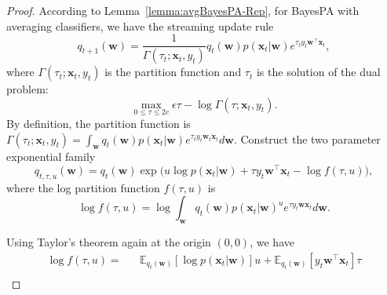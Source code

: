 \documentclass[twoside,11pt]{article}
\newcommand{\xv}{\bm{x}}
\newcommand{\wv}{\bm{w}}
\newcommand{\eat}[1]{}
\newcommand{\ep}{\mathbb{E}}
\newcommand{\E}{\mathbb{E}}
\newcommand{\strin}[1]{\todo[size=\small, color=green!40]{\bf\sf  #1}}
\newcommand{\jun}[1]{\marginpar{\color{blue}\tiny{Jun: #1}}}
\begin{document}
{\iffalse
\begin{proof}%
According to Lemma~\ref{lemma:avgBayesPA-Rep}, for BayesPA with averaging classifiers, we have the streaming update rule
\begin{equation*} %
q_{t+1}(\wv) = \frac{1}{\Gamma(\tau_t; \xv_t, y_t)} q_t(\wv) p(\xv_t | \wv)e^{\tau_t y_t \wv^\top \xv_t},
\end{equation*}
where $\Gamma(\tau_t; \xv_t, y_t)$ is the partition function and $\tau_t$ is the solution of the dual problem:
\begin{equation} \label{eq:bayespa_dual}
\max\limits_{0 \leq \tau \leq 2c}{\epsilon \tau - \log \Gamma(\tau; \xv_t, y_t)}.
\end{equation}
By definition, the partition function is
$\Gamma(\tau_t; \xv_t, y_t) = \int_{\wv}{q_t(\wv) p(\xv_t|\wv) e^{\tau_t y_t \wv_t \xv_t} d\wv}$. Construct the two parameter exponential family
\begin{equation*}
q_{t,\tau, u}(\wv) = q_t(\wv) \exp\Big(u \log p(\xv_t | \wv)+\tau y_t \wv^\top \xv_t-\log f(\tau, u)\Big),
\end{equation*}
where the log partition function $f(\tau, u)$ is
\begin{equation}
\log f(\tau, u) = \log \int_{\wv}{q_t(\wv) p(\xv_t | \wv)^u e^{\tau y_t \wv \xv_t} d\wv}. \nonumber
\end{equation}
\eat{which has the following properties
\begin{equation*}
\log f(0,0) = 0.
\end{equation*}
\begin{equation*}
\frac{\partial}{\partial u} f(\tau, u) = \ep_{q_{t,\tau, u}(\wv)}[\log p(\xv_t | \wv)].
\end{equation*}
\begin{equation*}
\frac{\partial}{\partial \tau} f(\tau, u) = \ep_{q_{t, \tau, u}(\wv)}[y_t \wv \xv_t].
\end{equation*}
\begin{equation*}
\frac{\partial^2}{\partial \tau \partial u} f(\tau, u) = \frac{\partial^2}{\partial u \partial \tau} f(\tau, u) = 0.
\end{equation*}}
Using Taylor's theorem again at the origin $(0,0)$, we have
\setlength\arraycolsep{1pt}\begin{eqnarray}
\log f(\tau, u) = && \ep_{q_t(\wv)} \left[\log p(\xv_t | \wv) \right] u +\E_{q_{t}(\wv)}\left[ y_t \wv^\top \xv_t \right] \tau  \nonumber \\

\end{eqnarray}
\end{proof}}
\end{document}
